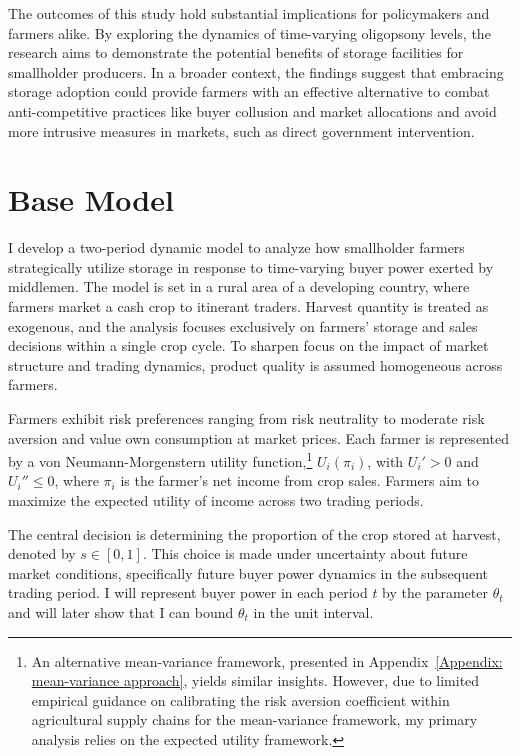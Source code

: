 The outcomes of this study hold substantial implications for policymakers and farmers alike. By exploring the dynamics of time-varying oligopsony levels, the research aims to demonstrate the potential benefits of storage facilities for smallholder producers. In a broader context, the findings suggest that embracing storage adoption could provide farmers with an effective alternative to combat anti-competitive practices like buyer collusion and market allocations and avoid more intrusive measures in markets, such as direct government intervention.





\section{Base Model}
\noindent I develop a two-period dynamic model to analyze how smallholder farmers strategically utilize storage in response to time-varying buyer power exerted by middlemen. The model is set in a rural area of a developing country, where farmers market a cash crop to itinerant traders. Harvest quantity is treated as exogenous, and the analysis focuses exclusively on farmers' storage and sales decisions within a single crop cycle. To sharpen focus on the impact of market structure and trading dynamics, product quality is assumed homogeneous across farmers.

Farmers exhibit risk preferences ranging from risk neutrality to moderate risk aversion and value own consumption at market prices. Each farmer is represented by a von Neumann-Morgenstern utility function,\footnote{An alternative mean-variance framework, presented in Appendix~\ref{Appendix: mean-variance approach}, yields similar insights. However, due to limited empirical guidance on calibrating the risk aversion coefficient within agricultural supply chains for the mean-variance framework, my primary analysis relies on the expected utility framework.} $U_i(\pi_i)$, with $U_i' > 0$ and $U_i'' \leq 0$, where $\pi_i$ is the farmer's net income from crop sales. Farmers aim to maximize the expected utility of income across two trading periods.

The central decision is determining the proportion of the crop stored at harvest, denoted by $s \in [0,1]$. This choice is made under uncertainty about future market conditions, specifically future buyer power dynamics in the subsequent trading period. I will represent buyer power in each period $t$ by the parameter $\theta_t$ and will later show that I can bound $\theta_t$ in the unit interval.

